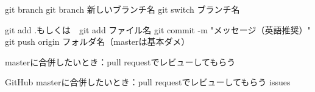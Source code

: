 git branch
git branch 新しいブランチ名
git switch ブランチ名

git add .もしくは　git add ファイル名
git commit -m "メッセージ（英語推奨）"
git push origin フォルダ名（masterは基本ダメ）

masterに合併したいとき：pull requestでレビューしてもらう

GitHub
masterに合併したいとき：pull requestでレビューしてもらう
issues